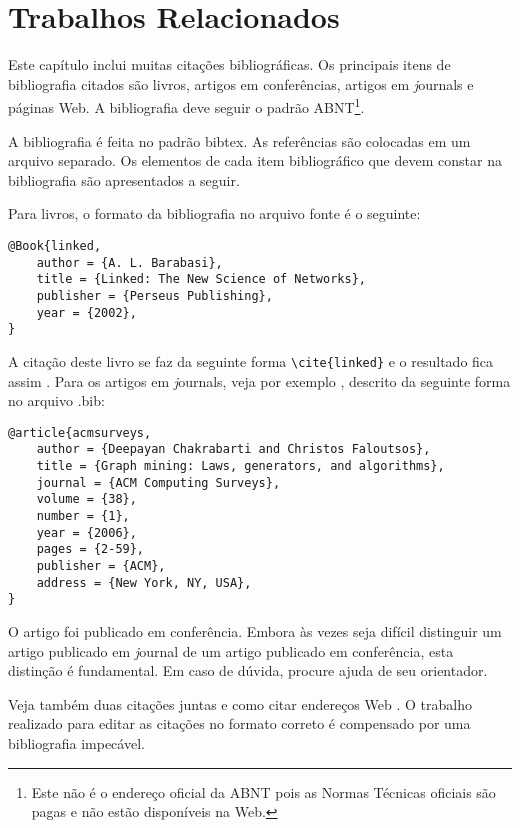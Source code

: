 %
%

\chapter{Trabalhos Relacionados}

Este capítulo inclui muitas citações bibliográficas. Os principais
itens de bibliografia citados são livros, artigos em conferências,
artigos em {\textit journals} e páginas Web. A bibliografia deve seguir o
padrão ABNT\footnote{Este não é o endereço oficial da
ABNT pois as Normas Técnicas oficiais são pagas e não estão disponíveis na Web.}.

A bibliografia é feita no padrão {\ttfamily bibtex}. As referências são
colocadas em um arquivo separado. Os elementos de
cada item bibliográfico que devem constar na bibliografia são
apresentados a seguir.

Para livros, o formato da bibliografia no arquivo fonte é o seguinte:

\begin{verbatim}
@Book{linked,
	author = {A. L. Barabasi},
	title = {Linked: The New Science of Networks},
	publisher = {Perseus Publishing},
	year = {2002},
}
\end{verbatim}

A citação deste livro se faz da seguinte forma \verb#\cite{linked}# e o resultado fica assim \cite{linked}.
Para os artigos em {\textit journals}, veja por exemplo \cite{acmsurveys},
descrito da seguinte forma no arquivo {\ttfamily .bib}:

\begin{verbatim}
@article{acmsurveys,
	author = {Deepayan Chakrabarti and Christos Faloutsos},
	title = {Graph mining: Laws, generators, and algorithms},
	journal = {ACM Computing Surveys},
	volume = {38},
	number = {1},
	year = {2006},
	pages = {2-59},
	publisher = {ACM},
	address = {New York, NY, USA},
}
\end{verbatim}

O artigo \cite{3faloutsos} foi publicado em conferência. Embora
às vezes seja difícil distinguir um artigo publicado em {\textit
 journal} de um artigo publicado em conferência, esta distinção é
fundamental. Em caso de dúvida, procure ajuda de seu orientador.

Veja também duas citações juntas \cite{rp99,mar00} e como citar
endereços Web \cite{irl:06}.
O trabalho realizado para editar as citações no formato correto é
compensado por uma bibliografia impecável.
